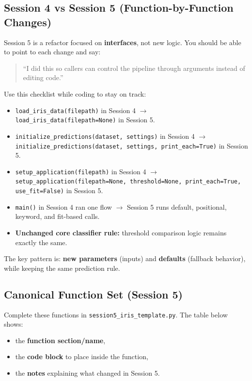 \subsection{Session 4 vs Session 5 (Function-by-Function Changes)}
Session 5 is a refactor focused on \textbf{interfaces}, not new logic.
You should be able to point to each change and say:
\begin{quote}
``I did this so callers can control the pipeline through arguments instead of editing code.''
\end{quote}

\noindent
Use this checklist while coding to stay on track:
\begin{itemize}
    \item \texttt{load\_iris\_data(filepath)} in Session 4 $\rightarrow$ \texttt{load\_iris\_data(filepath=None)} in Session 5.
    \item \texttt{initialize\_predictions(dataset, settings)} in Session 4 $\rightarrow$ \texttt{initialize\_predictions(dataset, settings, print\_each=True)} in Session 5.
    \item \texttt{setup\_application(filepath)} in Session 4 $\rightarrow$ \texttt{setup\_application(filepath=None, threshold=None, print\_each=True, use\_fit=False)} in Session 5.
    \item \texttt{main()} in Session 4 ran one flow $\rightarrow$ Session 5 runs default, positional, keyword, and fit-based calls.
    \item \textbf{Unchanged core classifier rule:} threshold comparison logic remains exactly the same.
\end{itemize}
\noindent
The key pattern is: \textbf{new parameters} (inputs) and \textbf{defaults} (fallback behavior), while keeping the same prediction rule.

\subsection{Canonical Function Set (Session 5)}
Complete these functions in \texttt{session5\_iris\_template.py}. The table below shows:
\begin{itemize}
    \item the \textbf{function section/name},
    \item the \textbf{code block} to place inside the function,
    \item the \textbf{notes} explaining what changed in Session 5.
\end{itemize}

